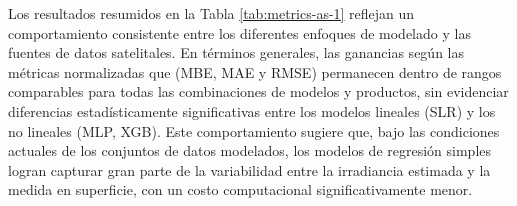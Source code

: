 \documentclass[letterpaper,12pt, twoside]{report}
\providecommand{\DIFdeltex}[1]{{\protect\color{red} \scriptsize #1}} %
\providecommand{\DIFdel}[1]{\texorpdfstring{\DIFdeltex{#1}}{}} %
\begin{document}


\DIFdel{Los resultados resumidos en la Tabla \ref{tab:metrics-as-1} reflejan un comportamiento consistente entre los diferentes enfoques de modelado y las fuentes de datos satelitales. En términos generales, las ganancias según las métricas normalizadas que (MBE, MAE y RMSE) permanecen dentro de rangos comparables para todas las combinaciones de modelos y productos, sin evidenciar diferencias estadísticamente significativas entre los modelos lineales (SLR) y los no lineales (MLP, XGB). Este comportamiento sugiere que, bajo las condiciones actuales de los conjuntos de datos modelados, los modelos de regresión simples logran capturar gran parte de la variabilidad entre la irradiancia estimada y la medida en superficie, con un costo computacional significativamente menor.}%
\end{document}

